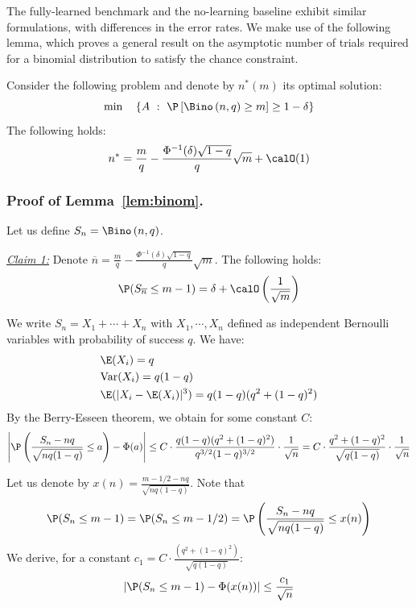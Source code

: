 \documentclass[blindrev]{informs3noheader}
\begin{document}
The fully-learned benchmark and the no-learning baseline exhibit similar formulations, with differences in the error rates. We make use of the following lemma, which proves a general result on the asymptotic number of trials required for a binomial distribution to satisfy the chance constraint.
\begin{lemma}\label{lem:binom}
Consider the following problem and denote by $n^*(m)$ its optimal solution:
$$\min\quad\left\{A\ :\ \P\left[\Bino\left(n,q\right)\geq m\right] \geq 1-\delta\right\}$$
The following holds:
$$n^*=\frac{m}{q}-\frac{\Phi^{-1}(\delta)\sqrt{1-q}}{q}\sqrt{m}+\calO(1)$$
\end{lemma}

\subsubsection{Proof of Lemma~\ref{lem:binom}.}

Let us define $S_n=\Bino\left(n,q\right)$.

\underline{\textit{Claim 1:}} Denote $\overline n=\frac{m}{q}-\frac{\Phi^{-1}(\delta)\sqrt{1-q}}{q}\sqrt{m}$. The following holds:
$$\P(S_{\overline n}\leq m-1)=\delta+\calO\left(\frac{1}{\sqrt{m}}\right)$$

We write $S_n=X_1+\cdots+X_n$ with $X_1,\cdots,X_n$ defined as independent Bernoulli variables with probability of success $q$. We have:
\begin{align*}
& \E(X_i)=q\\
& \text{Var}(X_i)=q(1-q)\\
& \E(|X_i-\E(X_i)|^3)=q(1-q)(q^2+(1-q)^2)
\end{align*}
By the Berry-Esseen theorem, we obtain for some constant $C$:
$$\left|\P\left(\frac{S_n-nq}{\sqrt{nq(1-q)}}\leq a\right)-\Phi(a)\right|\leq C\cdot\frac{q(1-q)(q^2+(1-q)^2)}{q^{3/2}(1-q)^{3/2}}\cdot\frac{1}{\sqrt n}=C\cdot\frac{q^2+(1-q)^2}{\sqrt{q(1-q)}}\cdot\frac{1}{\sqrt n}$$

Let us denote by $x(n)=\frac{m-1/2-nq}{\sqrt{nq(1-q)}}$. Note that
$$\P(S_n\leq m-1)=\P(S_n\leq m-1/2)=\P\left(\frac{S_n-nq}{\sqrt{nq(1-q)}}\leq x(n)\right)$$
We derive, for a constant $c_1=C\cdot\frac{(q^2+(1-q)^2)}{\sqrt{q(1-q)}}$:
$$\left|\P(S_n\leq m-1)-\Phi(x(n))\right|\leq \frac{c_1}{\sqrt n}$$
\end{document}
